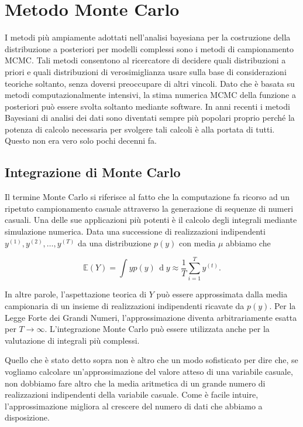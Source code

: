 \documentclass[
  11pt,
]{krantz}
\newcommand{\E}{\mathbb{E}} %
\theoremstyle{definition}
\theoremstyle{definition}
\theoremstyle{definition}
\theoremstyle{definition}
\theoremstyle{remark}
\begin{document}
\hypertarget{chapter-simulazioneMC}{%
\section{Metodo Monte Carlo}\label{chapter-simulazioneMC}}

I metodi più ampiamente adottati nell'analisi bayesiana per la costruzione della distribuzione a posteriori per modelli complessi sono i metodi di campionamento MCMC. Tali metodi consentono al ricercatore di decidere quali distribuzioni a priori e quali distribuzioni di verosimiglianza usare sulla base di considerazioni teoriche soltanto, senza doversi preoccupare di altri vincoli. Dato che è basata su metodi computazionalmente intensivi, la stima numerica MCMC della funzione a posteriori può essere svolta soltanto mediante software. In anni recenti i metodi Bayesiani di analisi dei dati sono diventati sempre più popolari proprio perché la potenza di calcolo necessaria per svolgere tali calcoli è alla portata di tutti. Questo non era vero solo pochi decenni fa.

\hypertarget{integration-mc}{%
\subsection{Integrazione di Monte Carlo}\label{integration-mc}}

Il termine Monte Carlo si riferisce al fatto che la computazione fa ricorso ad un ripetuto campionamento casuale attraverso la generazione di sequenze di numeri casuali. Una delle sue applicazioni più potenti è il calcolo degli integrali mediante simulazione numerica. Data una successione di realizzazioni indipendenti \(y^{(1)}, y^{(2)},\dots, y^{(T)}\) da una distribuzione \(p(y)\) con media \(\mu\) abbiamo che

\[
\E(Y) = \int y p(y) \,\operatorname {d}\!y \approx \frac{1}{T} \sum_{i=1}^T y^{(t)}.
\]

In altre parole, l'aspettazione teorica di \(Y\) può essere approssimata dalla media campionaria di un insieme di realizzazioni indipendenti ricavate da \(p(y)\). Per la Legge Forte dei Grandi Numeri, l'approssimazione diventa arbitrariamente esatta per \(T \rightarrow \infty\). L'integrazione Monte Carlo può essere utilizzata anche per la valutazione di integrali più complessi.

Quello che è stato detto sopra non è altro che un modo sofisticato per dire che, se vogliamo calcolare un'approssimazione del valore atteso di una variabile casuale, non dobbiamo fare altro che la media aritmetica di un grande numero di realizzazioni indipendenti della variabile casuale. Come è facile intuire, l'approssimazione migliora al crescere del numero di dati che abbiamo a disposizione.
\end{document}
